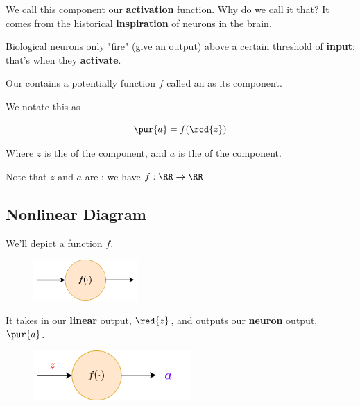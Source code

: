         We call this component our \textbf{activation} function. Why do we call it that? It comes from the historical \textbf{inspiration} of neurons in the brain.
        
        Biological neurons only "fire" (give an output) above a certain threshold of \textbf{input}: that's when they \textbf{activate}.
            \\
            
        \begin{definition}
            Our  contains a potentially  function $f$ called an  as its  component.
            
            We notate this as 
            
            \begin{equation}
                \pur{a} = f(\red{z})
            \end{equation}
            
            Where $z$ is the  of the  component, and $a$ is the  of the  component.
            
            Note that $z$ and $a$ are : we have $f: \RR \rightarrow \RR$
            
        \end{definition}
    
    \subsection{Nonlinear Diagram}
    
        We'll depict a function $f$.

        \begin{figure}[H]
            \centering
            \includegraphics[width=40mm,scale=0.4]{images/nn_images/nonlinear_func.png}
        \end{figure}
        
        It takes in our \textbf{linear} output, $\red{z}$, and outputs our \textbf{neuron} output, $\pur{a}$.
        
        \begin{figure}[H]
            \centering
            \qquad\quad\;
            \includegraphics[width=60mm,scale=0.4]{images/nn_images/nonlinear_unit.png}
        \end{figure}
        
